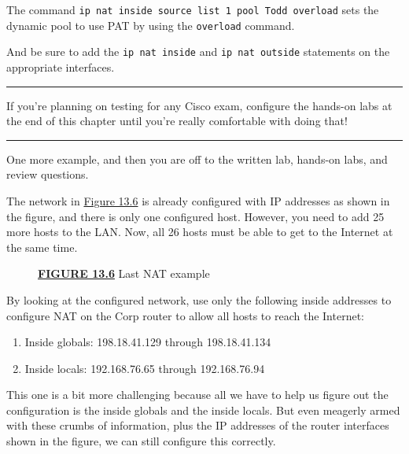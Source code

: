 The command
\texttt{ip\ nat\ inside\ source\ list\ 1\ pool\ Todd\ overload} sets the
dynamic pool to use PAT by using the \texttt{overload} command.

And be sure to add the \texttt{ip\ nat\ inside} and
\texttt{ip\ nat\ outside} statements on the appropriate interfaces.

\begin{center}\rule{0.5\linewidth}{0.5pt}\end{center}

If you're planning on testing for any
Cisco exam, configure the hands-on labs at the end of this chapter until
you're really comfortable with doing that!

\begin{center}\rule{0.5\linewidth}{0.5pt}\end{center}

One more example, and then you are off to the written lab, hands-on
labs, and review questions.

The network in
\protect\hyperlink{c13.xhtmlux5cux23figure13-6}{Figure 13.6} is already
configured with IP addresses as shown in the figure, and there is only
one configured host. However, you need to add 25 more hosts to the LAN.
Now, all 26 hosts must be able to get to the Internet at the same time.

\begin{figure}
\centering
\caption{{\protect\hyperlink{c13.xhtmlux5cux23figureanchor13-6}{\textbf{FIGURE
13.6}} Last NAT example}}
\end{figure}

By looking at the configured network, use only the following inside
addresses to configure NAT on the Corp router to allow all hosts to
reach the Internet:

\begin{enumerate}
\tightlist
\item
  Inside globals: 198.18.41.129 through 198.18.41.134
\item
  Inside locals: 192.168.76.65 through 192.168.76.94
\end{enumerate}

This one is a bit more challenging because all we have to help us figure
out the configuration is the inside globals and the inside locals. But
even meagerly armed with these crumbs of information, plus the IP
addresses of the router interfaces shown in the figure, we can still
configure this correctly.

